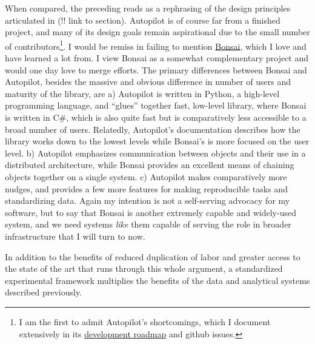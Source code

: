 \documentclass[10pt]{article}
\begin{document}
\begin{multicols}{2}
When compared, the preceding reads as a rephrasing of the design
principles articulated in (!! link to section). Autopilot is of course
far from a finished project, and many of its design goals remain
aspirational due to the small number of contributors\footnote{I am the
  first to admit Autopilot's shortcomings, which I document extensively
  in its
  \href{https://docs.auto-pi-lot.com/en/latest/todo.html}{development
  roadmap} and github issues.}. I would be remiss in failing to mention
\href{https://bonsai-rx.org/}{Bonsai}, which I love and have learned a
lot from. I view Bonsai as a somewhat complementary project and would
one day love to merge efforts. The primary differences between Bonsai
and Autopilot, besides the massive and obvious difference in number of
users and maturity of the library, are a) Autopilot is written in
Python, a high-level programming language, and ``glues'' together fast,
low-level library, where Bonsai is written in C\#, which is also quite
fast but is comparatively less accessible to a broad number of users.
Relatedly, Autopilot's documentation describes how the library works
down to the lowest levels while Bonsai's is more focused on the user
level. b) Autopilot emphasizes communication between objects and their
use in a distributed architecture, while Bonsai provides an excellent
means of chaining objects together on a single system. c) Autopilot
makes comparatively more nudges, and provides a few more features for
making reproducible tasks and standardizing data. Again my intention is
not a self-serving advocacy for my software, but to say that Bonsai is
another extremely capable and widely-used system, and we need systems
\emph{like} them capable of serving the role in broader infrastructure
that I will turn to now.

In addition to the benefits of reduced duplication of labor and greater
access to the state of the art that runs through this whole argument, a
standardized experimental framework multiplies the benefits of the data
and analytical systems described previously.


\end{multicols}
\end{document}

